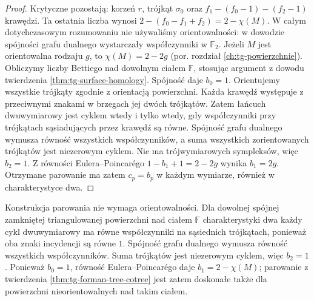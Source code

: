 \begin{proof}
Krytyczne pozostają: korzeń $r$,
trójkąt $\sigma_0$ oraz
$f_1-(f_0-1)-(f_2-1)$ krawędzi.
Ta ostatnia liczba wynosi
$2-(f_0-f_1+f_2)=2-\chi(M)$.
W całym dotychczasowym rozumowaniu nie używaliśmy
orientowalności: w dowodzie spójności grafu dualnego
wystarczały współczynniki w $\mathbb F_2$.
Jeżeli $M$ jest orientowalna rodzaju $g$, to
$\chi(M)=2-2g$ (por. rozdział \ref{ch:tg-powierzchnie}).
Obliczymy liczby Bettiego nad dowolnym ciałem
$\mathbb F$, stosując argument z dowodu twierdzenia
\ref{thm:tg-surface-homology}. Spójność daje $b_0=1$.
Orientujemy wszystkie trójkąty zgodnie z orientacją
powierzchni. Każda krawędź występuje z przeciwnymi
znakami w brzegach jej dwóch trójkątów. Zatem łańcuch
dwuwymiarowy jest cyklem wtedy i tylko wtedy, gdy
współczynniki przy trójkątach sąsiadujących przez
krawędź są równe. Spójność grafu dualnego wymusza
równość wszystkich współczynników, a suma wszystkich
zorientowanych trójkątów jest niezerowym cyklem.
Nie ma trójwymiarowych sympleksów, więc $b_2=1$.
Z równości Eulera--Poincarégo
$1-b_1+1=2-2g$ wynika $b_1=2g$.
Otrzymane parowanie ma zatem $c_p=b_p$ w każdym
wymiarze, również w charakterystyce dwa.
\end{proof}

\begin{uwaga}
Konstrukcja parowania nie wymaga orientowalności.
Dla dowolnej spójnej zamkniętej triangulowanej powierzchni
nad ciałem $\mathbb F$ charakterystyki dwa każdy cykl
dwuwymiarowy ma równe współczynniki na sąsiednich
trójkątach, ponieważ oba znaki incydencji są równe $1$.
Spójność grafu dualnego wymusza równość wszystkich
współczynników. Suma trójkątów jest niezerowym cyklem,
więc $b_2=1$. Ponieważ $b_0=1$, równość Eulera--Poincarégo
daje $b_1=2-\chi(M)$; parowanie z twierdzenia
\ref{thm:tg-forman-tree-cotree} jest zatem doskonałe
także dla powierzchni nieorientowalnych nad takim ciałem.
\end{uwaga}

